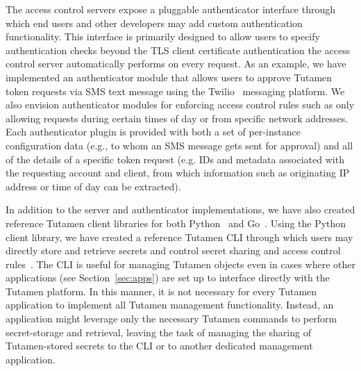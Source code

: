 The access control servers expose a pluggable authenticator interface
through which end users and other developers may add custom
authentication functionality. This interface is primarily designed to
allow users to specify authentication checks beyond the TLS client
certificate authentication the access control server automatically
performs on every request. As an example, we have implemented an
authenticator module that allows users to approve Tutamen token
requests via SMS text message using the Twilio~\cite{twilio} messaging
platform. We also envision authenticator modules for enforcing access
control rules such as only allowing requests during certain times of
day or from specific network addresses. Each authenticator plugin is
provided with both a set of per-instance configuration data (e.g., to
whom an SMS message gets sent for approval) and all of the details of
a specific token request (e.g. IDs and metadata associated with the
requesting account and client, from which information such as
originating IP address or time of day can be extracted).

In addition to the server and authenticator implementations, we have
also created reference Tutamen client libraries for both
Python~\cite{src-tutamen-pytutamen} and
Go~\cite{src-tutamen-go}. Using the Python client library, we have
created a reference Tutamen CLI through which users may directly store
and retrieve secrets and control secret sharing and access control
rules~\cite{src-tutamen-cli}. The CLI is useful for managing Tutamen
objects even in cases where other applications (see
Section~\ref{sec:apps}) are set up to interface directly with the
Tutamen platform. In this manner, it is not necessary for every
Tutamen application to implement all Tutamen management
functionality. Instead, an application might leverage only the
necessary Tutamen commands to perform secret-storage and retrieval,
leaving the task of managing the sharing of Tutamen-stored secrets to
the CLI or to another dedicated management application.

